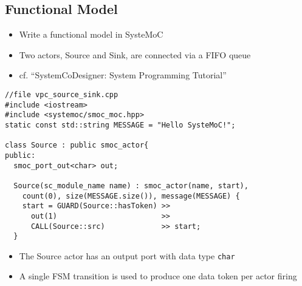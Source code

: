 \subsection{Functional Model}

\begin{frame}[t]
\begin{figure}
\centering
\resizebox{0.7\columnwidth}{!}{}
\end{figure}

\begin{itemize}
\item Write a functional model in SysteMoC
\item Two actors, Source and Sink, are connected via a FIFO queue
\item cf. ``SystemCoDesigner: System Programming Tutorial''
\end{itemize}

\end{frame}


\begin{frame}[fragile=singleslide]
\begin{lstlisting}
//file vpc_source_sink.cpp
#include <iostream>
#include <systemoc/smoc_moc.hpp>
static const std::string MESSAGE = "Hello SysteMoC!";

class Source : public smoc_actor{
public:
  smoc_port_out<char> out;

  Source(sc_module_name name) : smoc_actor(name, start),
    count(0), size(MESSAGE.size()), message(MESSAGE) {
    start = GUARD(Source::hasToken) >>
      out(1)                        >>
      CALL(Source::src)             >> start;
  }
\end{lstlisting}
\begin{itemize}
\item The Source actor has an output port with data type \lstinline!char!
\item A single FSM transition is used to produce one data token per actor firing
\end{itemize}
\end{frame}



